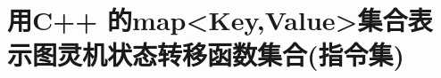 \begin{comment}
\foreach \x in {A_9,A_{10},A_{11},A_{12}} { \node[] at(\x) {\#};  }

\node[draw,arrow box,anchor=north,arrow box arrows={north:1cm,east:.5cm,west:.5cm},label=east:{R},label=west:{L}] (fsc) at(A_6.south) {FSM};

\node[anchor=west] at($(fsc.north east)+(-2mm,5mm)$) {read/write head};

\draw[red,dashed] ({$(A_0)+(-5mm,0)$} |- {$(fsc)+(0,-5mm)$}) rectangle ($(A_{12})+(5mm,10mm)$); 

\node[anchor=north west] at(A_0.south) {input tape};

\node[align=center] (b) at($(fsc)+(0,-10mm)$) {(b) 读写头移动. \\开始时, 读写头指向最左端的`*'所在的单元格};
\end{scope}

\node[anchor=north] at($(a)!.5!(b) +(0,-5mm)$) {FSM: Finite State Machine};
\end{tikzpicture}
\caption{图灵机工作原理}
\end{figure}
\end{comment}

\section{用C++ 的map<Key,Value>集合表示图灵机状态转移函数集合(指令集)}

